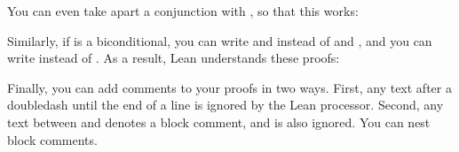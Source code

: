 \documentclass[letterpaper,10pt,english]{sphinxmanual}
\begin{document}
\sphinxAtStartPar
You can even take apart a conjunction with , so that this works:

\begin{sphinxVerbatim}[commandchars=\\\{\}]
             
     
\end{sphinxVerbatim}

\sphinxAtStartPar
Similarly, if  is a biconditional, you can write  and  instead of  and , and you can write  instead of . As a result, Lean understands these proofs:

\begin{sphinxVerbatim}[commandchars=\\\{\}]
             
   
 

             
           
\end{sphinxVerbatim}

\sphinxAtStartPar
Finally, you can add comments to your proofs in two ways. First, any text after a double\sphinxhyphen{}dash \sphinxcode{\sphinxupquote{\sphinxhyphen{}\sphinxhyphen{}}} until the end of a line is ignored by the Lean processor. Second, any text between \sphinxcode{\sphinxupquote{/\sphinxhyphen{}}} and \sphinxcode{\sphinxupquote{\sphinxhyphen{}/}} denotes a block comment, and is also ignored. You can nest block comments.
\end{document}
